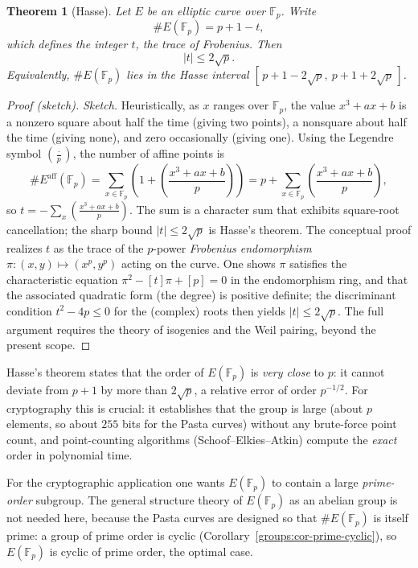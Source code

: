 \documentclass[11pt,a4paper]{article}
\newtheorem{theorem}{Theorem}[section]
\theoremstyle{definition}
\theoremstyle{remark}
\newcommand{\Fp}{\ensuremath{\mathbb{F}_{p}}}
\newcommand{\legendre}[2]{\left(\frac{#1}{#2}\right)}
\begin{document}
\begin{theorem}[Hasse]\label{ellipticcurves:thm-hasse}
Let \(E\) be an elliptic curve over \(\Fp\). Write
\[
  \#E(\Fp) = p + 1 - t,
\]
which \emph{defines} the integer \(t\), the \emph{trace of Frobenius}. Then
\[
  |t| \leq 2\sqrt{p}.
\]
Equivalently, \(\#E(\Fp)\) lies in the \emph{Hasse interval} \([\,p + 1 - 2\sqrt{p},\ p + 1 + 2\sqrt{p}\,]\).
\end{theorem}

\begin{proof}[Proof (sketch)]
\emph{Sketch.} Heuristically, as \(x\) ranges over \(\Fp\), the value \(x^3 + ax + b\) is a nonzero square about half the time (giving two points), a nonsquare about half the time (giving none), and zero occasionally (giving one). Using the Legendre symbol \(\legendre{\cdot}{p}\), the number of affine points is
\[
  \#E^{\mathrm{aff}}(\Fp) = \sum_{x \in \Fp}\left(1 + \legendre{x^3 + ax + b}{p}\right) = p + \sum_{x \in \Fp}\legendre{x^3 + ax + b}{p},
\]
so \(t = -\sum_{x}\legendre{x^3 + ax + b}{p}\). The sum is a character sum that exhibits square-root cancellation; the sharp bound \(|t| \leq 2\sqrt p\) is Hasse's theorem. The conceptual proof realizes \(t\) as the trace of the \(p\)-power \emph{Frobenius endomorphism} \(\pi\colon (x,y)\mapsto (x^p, y^p)\) acting on the curve. One shows \(\pi\) satisfies the characteristic equation \(\pi^2 - [t]\pi + [p] = 0\) in the endomorphism ring, and that the associated quadratic form (the degree) is positive definite; the discriminant condition \(t^2 - 4p \le 0\) for the (complex) roots then yields \(|t| \le 2\sqrt p\). The full argument requires the theory of isogenies and the Weil pairing, beyond the present scope.
\end{proof}

Hasse's theorem states that the order of \(E(\Fp)\) is \emph{very close} to \(p\): it cannot deviate from \(p + 1\) by more than \(2\sqrt p\), a relative error of order \(p^{-1/2}\). For cryptography this is crucial: it establishes that the group is large (about \(p\) elements, so about \(255\) bits for the Pasta curves) without any brute-force point count, and point-counting algorithms (Schoof--Elkies--Atkin) compute the \emph{exact} order in polynomial time.

For the cryptographic application one wants \(E(\Fp)\) to contain a large \emph{prime-order} subgroup. The general structure theory of \(E(\Fp)\) as an abelian group is not needed here, because the Pasta curves are designed so that \(\#E(\Fp)\) is itself prime: a group of prime order is cyclic (Corollary~\ref{groups:cor-prime-cyclic}), so \(E(\Fp)\) is cyclic of prime order, the optimal case.
\end{document}
